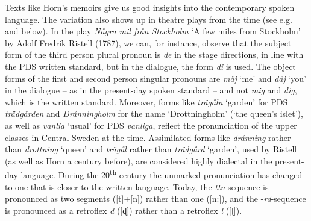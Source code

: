 \documentclass[output=paper]{langscibook}
\begin{document}
Texts like Horn’s memoirs give us good insights into the contemporary spoken language. The variation also shows up in theatre plays from the time (see e.g. \citealt{Widmark1970} and below). In the play \textit{Några mil från Stockholm} ‘A few miles from Stockholm’ by Adolf Fredrik Ristell (1787), we can, for instance, observe that the subject form of the third person plural pronoun is \textit{de} in the stage directions, in line with the PDS written standard, but in the dialogue, the form \textit{di} is used. The object forms of the first and second person singular pronouns are \textit{mäj} ‘me’ and \textit{däj} ‘you’ in the dialogue – as in the present-day spoken standard – and not \textit{mig} and \textit{dig}, which is the written standard. Moreover, forms like \textit{trägåln} ‘garden’ for PDS \textit{trädgården} and \textit{Drånningholm} for the name ‘Drottningholm’ (‘the queen’s islet’), as well as \textit{vanlia} ‘usual’ for PDS \textit{vanliga}, reflect the pronunciation of the upper classes in Central Sweden at the time. Assimilated forms like \textit{drånning} rather than \textit{drottning} ‘queen’ and \textit{trägål} rather than \textit{trädgård} ‘garden’, used by Ristell (as well as Horn a century before), are considered highly dialectal in the present-day language. During the 20\textsuperscript{th} century the unmarked pronunciation has changed to one that is closer to the written language. Today, the \textit{ttn}{}-sequence is pronounced as two segments ([t]+[n]) rather than one ([n:]), and the -\textit{rd}{}-sequence is pronounced as a retroflex \textit{d} ([ɖ]) rather than a retroflex \textit{l} ([ɭ]).
\end{document}
